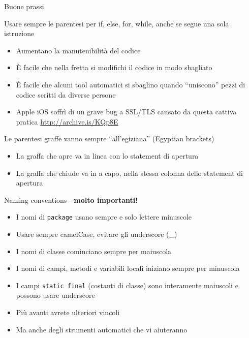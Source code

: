 \documentclass[presentation]{beamer}
\begin{document}
\begin{frame}[allowframebreaks]{Buone prassi}
	\begin{block}{Usare sempre le parentesi per if, else, for, while, anche se segue una sola istruzione}
		\begin{itemize}
			\item Aumentano la manutenibilità del codice
			\item È facile che nella fretta si modifichi il codice in modo sbagliato
			\item È facile che alcuni tool automatici si sbaglino quando ``uniscono'' pezzi di codice scritti da diverse persone
			\item Apple iOS soffrì di un grave bug a SSL/TLS causato da questa cattiva pratica \url{http://archive.is/KQp8E}
		\end{itemize}
	\end{block}
	\begin{block}{Le parentesi graffe vanno sempre ``all'egiziana'' (Egyptian brackets)}
		\begin{itemize}
			\item La graffa che apre va in linea con lo statement di apertura
			\item La graffa che chiude va in a capo, nella stessa colonna dello statement di apertura
		\end{itemize}
	\end{block}
	\begin{block}{Naming conventions - \textbf{molto importanti!}}
		\begin{itemize}
			\item I nomi di \texttt{package} usano sempre e solo lettere minuscole
			\item Usare sempre camelCase, evitare gli underscore (\_)
			\item I nomi di classe cominciano sempre per maiuscola
			\item I nomi di campi, metodi e variabili locali iniziano sempre per minuscola
			\item I campi \texttt{static final} (costanti di classe) sono interamente maiuscoli e possono usare underscore
		\end{itemize}
	\end{block}
	\begin{itemize}
		\item Più avanti avrete ulteriori vincoli
		\item Ma anche degli strumenti automatici che vi aiuteranno
	\end{itemize}
\end{frame}
\end{document}
